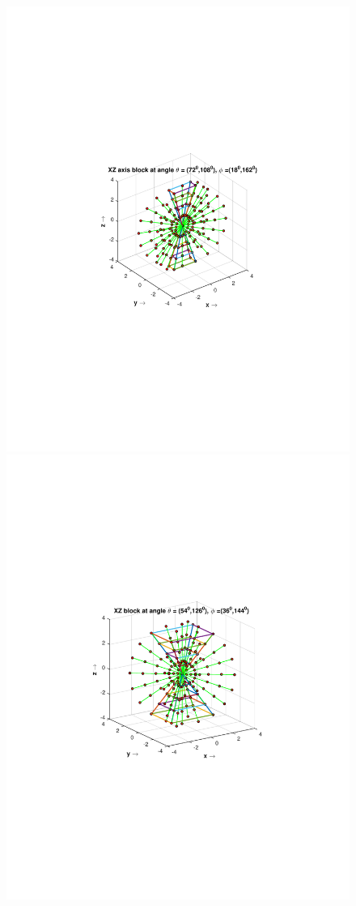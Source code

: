 \documentclass{UCF_ETD}
\begin{document}
\begin{figure}[H]
\begin{center}
 \includegraphics[scale=0.53]{PolarSphericalDFT/XZBlockLevel1}
 \includegraphics[scale=0.54]{PolarSphericalDFT/XZBlockLevel22}

\end{center}
\end{figure}
\end{document}
